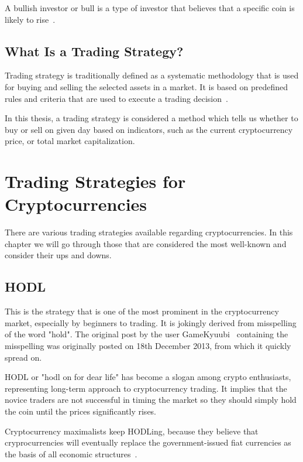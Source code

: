 A bullish investor or bull is a type of investor that believes that a specific coin is likely to rise~\cite{investopedia-bull}.

\section{What Is a Trading Strategy?}
Trading strategy is traditionally defined as a systematic methodology that is used for buying and selling the selected assets in a market. It is based on predefined rules and criteria that are used to execute a trading decision~\cite{investopedia:trading-strategy}.

In this thesis, a trading strategy is considered a method which tells us whether to buy or sell on given day based on indicators, such as the current cryptocurrency price, or total market capitalization.

\chapter{Trading Strategies for Cryptocurrencies}
\label{chapter-trading-stategies}

There are various trading strategies available regarding cryptocurrencies.
In this chapter we will go through those that are considered the most well-known and consider
their ups and downs.

\section{HODL}

This is the strategy that is one of the most prominent in the cryptocurrency market, especially by beginners to trading.
It is jokingly derived from misspelling of the word "hold". The original post by the user GameKyuubi~\cite{hodl-post} containing the misspelling was originally posted on 18th December 2013, from which it quickly spread on.

HODL or "hodl on for dear life" has become a slogan among crypto enthusiasts, representing long-term approach to cryptocurrency trading. It implies that the novice traders are not successful in timing the market so they should simply hold the coin until the prices significantly rises.

Cryptocurrency maximalists keep HODLing, because they believe that cryprocurrencies will eventually replace the government-issued fiat currencies as the basis of all economic structures~\cite{investopedia-hodl}.

